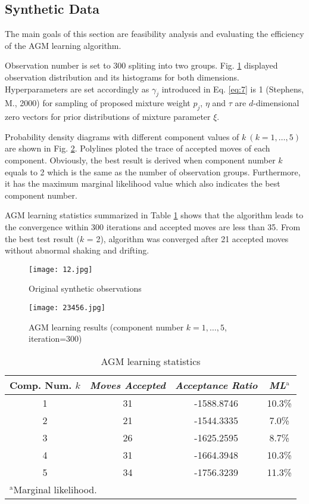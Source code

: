 \documentclass[conference]{llncs}
\begin{document}
\subsection{Synthetic Data}
The main goals of this section are feasibility analysis and evaluating the efficiency of the AGM learning algorithm.

Observation number is set to 300 spliting into two groups. Fig. \ref{fig:1} displayed observation distribution and its histograms for both dimensions. Hyperparameters are set accordingly as $\gamma_j$ introduced in Eq. \eqref{eq:7} is 1 (Stephens, M., 2000) \cite{b11} for sampling of proposed mixture weight $p_j$, $\eta$ and $\tau$ are $d$-dimensional zero vectors for prior distributions of mixture parameter $\xi$.

Probability density diagrams with different component values of $k\ (k = 1,\dots,5)$ are shown in Fig. \ref{fig:2}. Polylines ploted the trace of accepted moves of each component. Obviously, the best result is derived when component number $k$ equals to 2 which is the same as the number of observation groups. Furthermore, it has the maximum marginal likelihood value which also indicates the best component number.

AGM learning statistics summarized in Table \ref{tab1} shows that the algorithm leads to the convergence within 300 iterations and accepted moves are less than 35. From the best test result ($k$ = 2), algorithm was converged after 21 accepted moves without abnormal shaking and drifting.

\begin{figure}[h]
\centering
\texttt{[image: 12.jpg]}
\caption{Original synthetic observations}
\label{fig:1}
\end{figure}

\begin{figure}[h]
\centering
\texttt{[image: 23456.jpg]}
\caption{AGM learning results (component number $k=1,\dots,5$, iteration=300)}
\label{fig:2}
\end{figure}

\begin{table}[h]
\caption{AGM learning statistics}
\begin{center}
\begin{tabular}{|c|c|c|c|}
\hline
\textbf{Comp. Num. $k$} & \textbf{\textit{Moves Accepted}}& \textbf{\textit{Acceptance Ratio}}& \textbf{\textit{ML$^{\mathrm{a}}$}} \\
\hline
1 & 31 & -1588.8746 & 10.3\%  \\
2 & 21 & -1544.3335 & 7.0\% \\
3 & 26 & -1625.2595 & 8.7\% \\
4 & 31 & -1664.3948 & 10.3\% \\
5 & 34 & -1756.3239 & 11.3\% \\
\hline
\multicolumn{4}{l}{$^{\mathrm{a}}$Marginal likelihood.}
\end{tabular}
\label{tab1}
\end{center}
\end{table}
\end{document}
